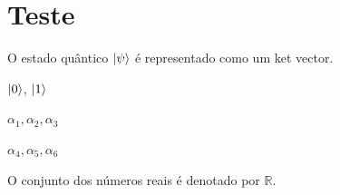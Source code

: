 \documentclass[12pt]{article}
\begin{document}
\section{Teste}

O estado quântico $\ket{\psi}$ é representado como um ket vector.

$\ket{0}$, $\ket{1}$

$\alpha_{1}, \alpha_{2}, \alpha_{3}$

\(\alpha_{4}, \alpha_{5}, \alpha_{6} \)

O conjunto dos números reais é denotado por $\mathbb{R}$.



\newpage

	
\end{document}
